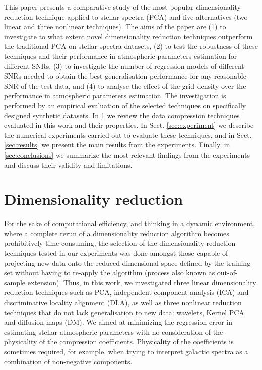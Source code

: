 \documentclass[a4paper,fleqn,usenatbib]{mnras}
\begin{document}
{This paper presents a comparative study of the most popular
dimensionality reduction technique applied to stellar spectra (PCA)
and five alternatives (two linear and three nonlinear
techniques). The aims of the paper are (1) to investigate to what
extent novel dimensionality reduction techniques outperform the
traditional PCA on stellar spectra datasets, (2) to test the
robustness of these techniques and their performance in atmospheric
parameters estimation for different SNRs, (3) to investigate the
number of regression models of different SNRs needed to obtain the
best generalisation performance for any reasonable SNR of the test
data, and (4) to analyse the effect of the grid density over the 
performance in atmospheric parameters estimation.  
The investigation is performed by an empirical evaluation of
the selected techniques on specifically designed synthetic
datasets. In \ref{sec:dimred} we review the data compression
techniques evaluated in this work and their properties. In
Sect. \ref{sec:experiment} we describe the numerical experiments
carried out to evaluate these techniques, and in
Sect. \ref{sec:results} we present the main results from the
experiments. Finally, in \ref{sec:conclusions} we summarize the most
relevant findings from the experiments and discuss their validity
and limitations.

\section{Dimensionality reduction}
\label{sec:dimred}

For the sake of computational efficiency, and thinking in a 
dynamic environment, where a complete rerun of a dimensionality 
reduction algorithm becomes prohibitively time consuming, 
the selection of the dimensionality reduction techniques tested
  in our experiments was done amongst those capable of projecting new
  data onto the reduced dimensional space defined by the training set
  without having to re-apply the algorithm (process also known as 
  out-of-sample extension). Thus, in this work, we investigated three
linear dimensionality reduction techniques such as PCA, independent
component analysis (ICA) and discriminative locality alignment (DLA),
as well as three nonlinear reduction techniques that do not lack 
generalisation to new data: wavelets, Kernel PCA and diffusion maps (DM). 
We aimed at minimizing the regression
  error in estimating stellar atmospheric parameters with no
  consideration of the physicality of the compression
  coefficients. Physicality of the coefficients is sometimes
  required, for example, when trying to interpret galactic spectra as
  a combination of non-negative components.


}
\end{document}
